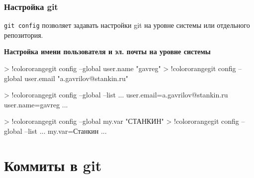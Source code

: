 \documentclass[9pt, aspectratio=1610]{beamer}
\begin{document}
\begin{frame}[fragile]\frametitle{Настройка git}
	
	\begin{alertblock}{\Verb|git config|}
	  позволяет задавать настройки git на уровне системы или отдельного репозитория.
		
	\end{alertblock}
	
	\smallskip

	\textbf{Настройка имени пользователя и эл. почты на уровне системы}
	\begin{VerbatimCmd}
		
		> !color{orange}git config --global user.name "gavreg"
		> !color{orange}git config --global user.email "a.gavrilov@stankin.ru"
		
		> !color{orange}git config --global --list
		...
		user.email=a.gavrilov@stankin.ru
		user.name=gavreg
		...		
	\end{VerbatimCmd}
	
	\smallskip
	
	\begin{VerbatimCmd}
		
		> !color{orange}git config --global my.var "СТАНКИН"
		> !color{orange}git config --global --list
		...
		my.var=Станкин
		...
		
	\end{VerbatimCmd}
	
		
	
\end{frame}

\section{Коммиты в git}

\begin{frame}
	\tableofcontents
	\sectionpage
\end{frame}
\end{document}
